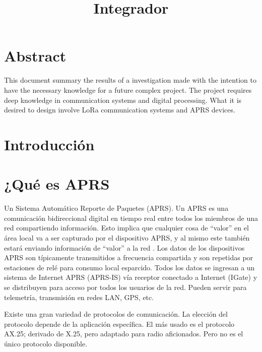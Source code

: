 \documentclass[conference]{IEEEtran}
\title{Integrador}
\author{\IEEEauthorblockN{1\textsuperscript{st} Justin Corea M}
\IEEEauthorblockA{\textit{Escuela de Ingeniería Electrónica} \\
	\textit{Instituto Tecnológico de Costa Rica}\\
	Cartago, Costa Rica \\
	coreajustin288@estudiantec.cr
}
}
\begin{document}
\onecolumn	
\maketitle

\section{Abstract}
This document summary the results of a investigation made with the intention to have the necessary
knowledge for a future complex project. The project requires deep knowledge in communication systems 
and digital processing. What it is desired to design involve LoRa communication systems and APRS devices. 

\section{Introducción}

\section{¿Qué es APRS}
Un Sistema Automático Reporte de Paquetes (APRS). Un APRS es una comunicación bidireccional 
digital en tiempo real entre todos los miembros de una red compartiendo información. 
Esto implica que cualquier cosa de “valor” en el área local va a ser capturado por el dispositivo APRS,
y al mismo este también estará enviando información de “valor” a la red \cite{APRSFund}.
Los datos de los dispositivos APRS son típicamente transmitidos a frecuencia compartida
y son repetidas por estaciones de relé para consumo local esparcido.
Todos los datos se ingresan a un sistema de Internet APRS (APRS-IS) 
vía receptor conectado a Internet (IGate) y se distribuyen para acceso por todos los usuarios de la red.
Pueden servir para telemetría, transmisión en redes LAN, GPS, etc.

Existe una gran variedad de protocolos de comunicación.
La elección del protocolo depende de la aplicación específica. 
El más usado es el protocolo AX.25; derivado de X.25, pero adaptado para radio aficionados.
Pero no es el único protocolo disponible.
\end{document}
